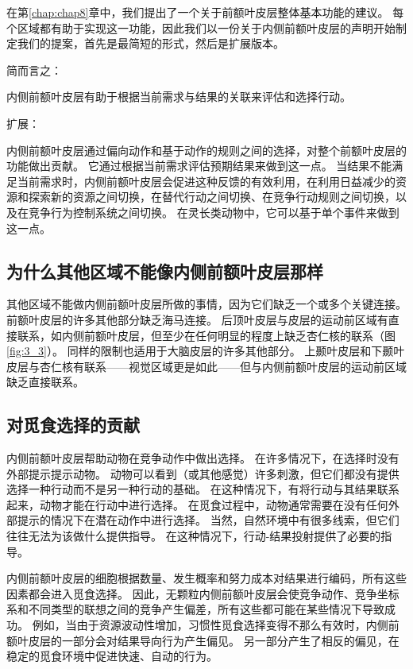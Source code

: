 在第\ref{chap:chap8}章中，我们提出了一个关于前额叶皮层整体基本功能的建议。
每个区域都有助于实现这一功能，因此我们以一份关于内侧前额叶皮层的声明开始制定我们的提案，首先是最简短的形式，然后是扩展版本。\par


简而言之：\par
内侧前额叶皮层有助于根据当前需求与结果的关联来评估和选择行动。\par
扩展：\par
内侧前额叶皮层通过偏向动作和基于动作的规则之间的选择，对整个前额叶皮层的功能做出贡献。
它通过根据当前需求评估预期结果来做到这一点。
当结果不能满足当前需求时，内侧前额叶皮层会促进这种反馈的有效利用，在利用日益减少的资源和探索新的资源之间切换，在替代行动之间切换、在竞争行动规则之间切换，以及在竞争行为控制系统之间切换。
在灵长类动物中，它可以基于单个事件来做到这一点。\par



\subsection{为什么其他区域不能像内侧前额叶皮层那样}

其他区域不能做内侧前额叶皮层所做的事情，因为它们缺乏一个或多个关键连接。
前额叶皮层的许多其他部分缺乏海马连接。
后顶叶皮层与皮层的运动前区域有直接联系，如内侧前额叶皮层，但至少在任何明显的程度上缺乏杏仁核的联系（图\ref{fig:3_3}）。
同样的限制也适用于大脑皮层的许多其他部分。
上颞叶皮层和下颞叶皮层与杏仁核有联系——视觉区域更是如此——但与内侧前额叶皮层的运动前区域缺乏直接联系。\par



\subsection{对觅食选择的贡献}

内侧前额叶皮层帮助动物在竞争动作中做出选择。
在许多情况下，在选择时没有外部提示提示动物。
动物可以看到（或其他感觉）许多刺激，但它们都没有提供选择一种行动而不是另一种行动的基础。
在这种情况下，有将行动与其结果联系起来，动物才能在行动中进行选择。
在觅食过程中，动物通常需要在没有任何外部提示的情况下在潜在动作中进行选择。
当然，自然环境中有很多线索，但它们往往无法为该做什么提供指导。
在这种情况下，行动-结果投射提供了必要的指导。\par


内侧前额叶皮层的细胞根据数量、发生概率和努力成本对结果进行编码，所有这些因素都会进入觅食选择。
因此，无颗粒内侧前额叶皮层会使竞争动作、竞争坐标系和不同类型的联想之间的竞争产生偏差，所有这些都可能在某些情况下导致成功。
例如，当由于资源波动性增加，习惯性觅食选择变得不那么有效时，内侧前额叶皮层的一部分会对结果导向行为产生偏见。
另一部分产生了相反的偏见，在稳定的觅食环境中促进快速、自动的行为。\par



